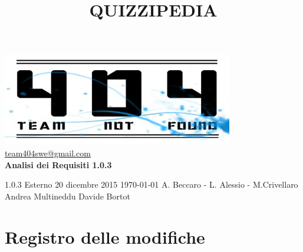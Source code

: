 \documentclass[a4paper,11pt]{article}
\title{\textbf{{\fontsize{8mm}{5mm}\selectfont QUIZZIPEDIA}}}
\date{}
\author{}
\begin{document}
	\maketitle
	\thispagestyle{empty}
	\begin{center}
	\includegraphics{team_not_found.jpg}\\
	\fontsize{5mm}{3mm}\url{team404swe@gmail.com}\\
	
	\vspace{50mm}
	\textbf{Analisi dei Requisiti 1.0.3}
	\end{center}
	
			{1.0.3} 							%
			{Esterno} 						%
			{20 dicembre 2015} 				%
			{\today} 						%
			{A. Beccaro - L. Alessio - M.Crivellaro}	%
			{Andrea Multineddu} 				%
			{Davide Bortot} 		%
	\newpage
	\thispagestyle{empty}
	\null
	\newpage
		
	\hspace{30 mm}
	\fancyfoot[R]{\thepage}
	\section*{Registro delle modifiche}
	
\end{document}
